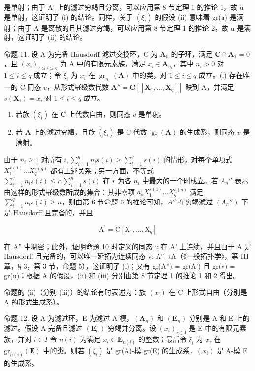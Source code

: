 是单射；由于 A' 上的滤过穷竭且分离，可以应用第 8 节定理 1 的推论 1，故 u 是单射，这证明了 (i) 的结论。同样，关于 \((\xi_{i})\) 的假设 (ii) 意味着 gr(u) 是满射；由于 A 是离散的且其滤过穷竭，可以应用第 8 节定理 1 的推论 2，故 u 是满射，这证明了 (ii) 的结论。

	命题 11. 设 A 为完备 Hausdorff 滤过交换环，C 为 \(\mathbf{A}_0\) 的子环，满足 \(\mathbf{C} \cap \mathbf{A}_1 = 0\)，且 \((x_i)_{1 \leqslant i \leqslant q}\) 为 A 中的有限元素族，满足 \(x_i \in \mathbf{A}_{n_i}\)，其中 \(n_i > 0\) 对 \(1 \leqslant i \leqslant q\) 成立；令 \(\xi_i\) 为 \(x_i\) 在 \(\operatorname{gr}_{n_i}(\mathbf{A})\) 中的类，对 \(1 \leqslant i \leqslant q\) 成立。(i) 存在唯一的 C-同态 \(v\)，从形式幂级数代数 \(\mathbf{A}'' = \mathbf{C}[[\mathbf{X}_1, \ldots, \mathbf{X}_q]]\) 映到 A，并满足 \(v(\mathbf{X}_i) = x_i\) 对 \(1 \leqslant i \leqslant q\) 成立。

\begin{enumerate}
\def\labelenumi{(\roman{enumi})}
\setcounter{enumi}{1}
\item
  若族 \((\xi_{i})\) 在 \(\mathbf{C}\) 上代数自由，则同态 \(v\) 是单射。
\item
  若 \(\mathbf{A}\) 上的滤过穷竭，且族 \((\xi_{i})\) 是 C-代数 \(\operatorname{gr}(\mathbf{A})\) 的生成系，则同态 \(v\) 是满射。
\end{enumerate}

	由于 \(n_i \geqslant 1\) 对所有 \(i, \sum_{i=1}^{q} n_i s(i) \geqslant \sum_{i=1}^{q} s(i)\) 的情形，对每个单项式 \(X_1^{s(1)} \ldots X_q^{s(q)}\) 都有上述关系；另一方面，不等式 \(\sum_{i=1}^{q} n_i s(i) \leqslant r. \sum_{i=1}^{q} s(i)\) 在 \(r\) 为各 \(n_i\) 中最大的一个时成立。若 \(A_n''\) 表示由这样的形式幂级数所成的集合：其非零项 \(a_s X_1^{s(1)} \ldots X_q^{s(q)}\) 满足 \(\sum_{i=1}^{q} n_i s(i) \geqslant n\)，则由第 6 节命题 6 的推论可知，\(A''\) 在穷竭滤过 \((A_n'')\) 下是 Hausdorff 且完备的，并且

\[
\mathrm{A} ^ {\prime} = \mathrm{C} [ \mathrm{X} _ {1}, \dots , \mathrm{X} _ {q} ]
\]

在 A'' 中稠密；此外，证明命题 10 时定义的同态 u 在 A' 上连续，并且由于 A 是 Hausdorff 且完备的，可以唯一延拓为连续同态 v: A''→A（《一般拓扑学》，第 III 章，§ 3，第 3 节，命题 5），这证明了 (i)；又有 gr(A'') = gr(A') 且 gr(v) = gr(u)；根据 A 的假设，(ii) 和 (iii) 分别由第 8 节定理 1 的推论 1 和 2 得出。

命题的 (ii)（分别 (iii)）的结论有时表述为：族 \((x_{i})\) 在 C 上形式自由（分别是 A 的形式生成系）。

命题 12. 设 A 为滤过环，E 为滤过 A-模，\((\mathbf{A}_{n})\) 和 \((\mathbf{E}_{n})\) 分别是 A 和 E 上的滤过。假设 A 完备且滤过 \((\mathbf{E}_{n})\) 穷竭并分离。设 \((x_{i})_{i\in\mathbf{I}}\) 是 E 中的有限元素族，并对 \(i\in I\) 令 \(n(i)\) 为满足 \(x_{i}\in\mathbf{E}_{n(i)}\) 的整数；最后令 \(\xi_{i}\) 为 \(x_{i}\) 在 \(\mathrm{gr}_{n(i)}(\mathbf{E})\) 中的类。则若 \((\xi_{i})\) 是 gr(A)-模 gr(E) 的生成系，\((x_{i})\) 是 A-模 E 的生成系。

